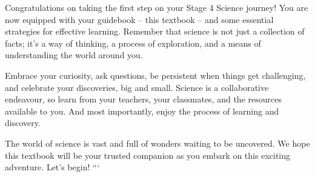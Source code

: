 Congratulations on taking the first step on your Stage 4 Science journey!  You are now equipped with your guidebook – this textbook – and some essential strategies for effective learning.  Remember that science is not just a collection of facts; it’s a way of thinking, a process of exploration, and a means of understanding the world around you.

Embrace your curiosity, ask questions, be persistent when things get challenging, and celebrate your discoveries, big and small.  Science is a collaborative endeavour, so learn from your teachers, your classmates, and the resources available to you.  And most importantly, enjoy the process of learning and discovery.

The world of science is vast and full of wonders waiting to be uncovered.  We hope this textbook will be your trusted companion as you embark on this exciting adventure.  Let’s begin!
```